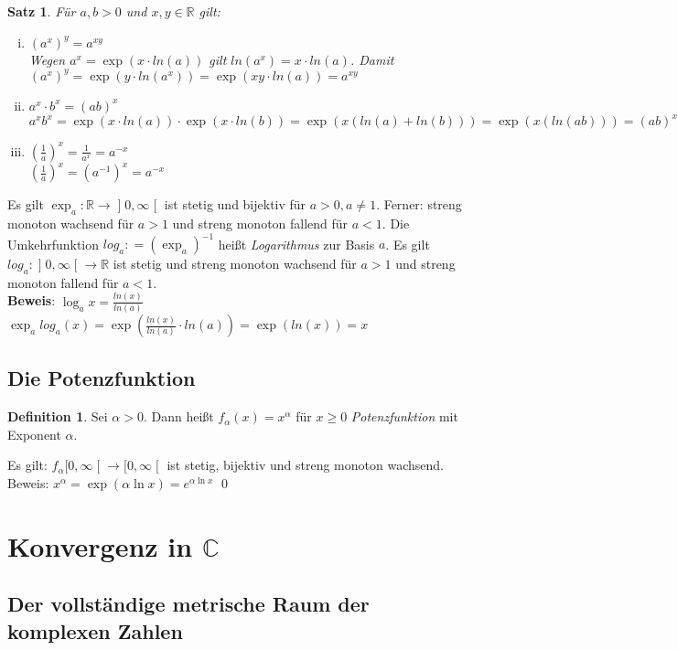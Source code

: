 \documentclass[ngerman,titlepage,twoside, parskip=half*]{scrreprt}
\newcommand*{\R}{\mathbb{R}}
\newcommand*{\C}{\mathbb{C}}
\theoremstyle{plain}
\newtheorem{theorem}{Satz}[section]
\theoremstyle{definition}
\newtheorem{definition}{Definition}
\theoremstyle{remark}
\newcommand*{\coloneqq}{\mathrel{\mathop:}=}
\newcommand*{\rsofint}[1]{[#1\mathclose{[}}  %
\newcommand*{\bsofint}[1]{\mathopen{]}#1\mathclose{[}} %
\begin{document}
\begin{theorem}
Für $a,b>0$ und $x,y\in \R$ gilt:
\begin{enumerate}[i)]
  \item $(a^x)^y=a^{xy}$\\
    Wegen $a^x=\exp(x \cdot ln(a))$ gilt $ln (a^x)=x \cdot ln (a)$. Damit $(a^x)^y=\exp(y\cdot ln(a^x))=\exp(xy\cdot ln(a))
    =a^{xy}$
  \item $a^x\cdot b^x=(ab)^x$\\
    $a^xb^x=\exp(x\cdot ln(a))\cdot \exp(x\cdot ln(b))=\exp(x(ln(a)+ln(b)))=\exp(x(ln(ab)))=(ab)^x$
  \item $(\frac{1}{a})^x=\frac{1}{a^x}=a^{-x}$\\
    $(\frac{1}{a})^x=(a^{-1})^x=a^{-x}$
\end{enumerate}
\end{theorem}

Es gilt $\exp_a \colon\R\rightarrow \bsofint{0,\infty}$ ist stetig und bijektiv für $a>0, a\neq 1$. Ferner: streng monoton wachsend
für $a>1$ und streng monoton fallend für $a<1$.
Die Umkehrfunktion $log_a\coloneqq(\exp_a)^{-1}$ heißt \emph{Logarithmus} zur Basis $a$. Es gilt $log_a\colon
\bsofint{0,\infty} \rightarrow \R$ ist stetig und streng monoton wachsend für $a>1$ und streng monoton fallend für $a<1$.\\
\textbf{Beweis}: $\log_ax=\frac{ln(x)}{ln(a)}$\\
$\exp_alog_a(x)=\exp(\frac{ln(x)}{ln(a)}\cdot ln (a))=\exp (ln (x))=x$

\subsection{Die Potenzfunktion}
\begin{definition}
Sei $\alpha>0$. Dann heißt $f_{\alpha}(x)=x^{\alpha}$ für $x\geq 0$ \emph{Potenzfunktion}
mit Exponent $\alpha$.
\end{definition}

Es gilt: $f_{\alpha}\rsofint{0,\infty}\rightarrow \rsofint{0,\infty}$ ist stetig, bijektiv und streng monoton
wachsend.\\
Beweis: $x^{\alpha}=\exp(\alpha \ln x)=e^{\alpha \ln x}$
\qed

\section{Konvergenz in \texorpdfstring{$\C$}{C}}
\subsection{Der vollständige metrische Raum der komplexen Zahlen}
\end{document}
